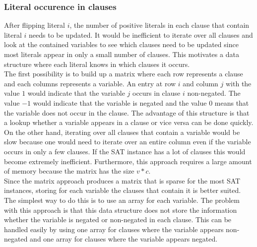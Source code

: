 \documentclass[12pt,a4paper]{article}
\begin{document}
\subsubsection{Literal occurence in clauses}
After flipping literal $i$, the number of positive literals in each clause that contain literal $i$ needs to be updated. It would be inefficient to iterate over all clauses and look at the contained variables to see which clauses need to be updated since most literals appear in only a small number of clauses. This motivates a data structure where each literal knows in which clauses it occurs.\\
The first possibility is to build up a matrix where each row represents a clause and each columns represents a variable. An entry at row $i$ and column $j$ with the value $1$ would indicate that the variable $j$ occurs in clause $i$ non-negated. The value $-1$ would indicate that the variable is negated and the value $0$ means that the variable does not occur in the clause. The advantage of this structure is that a lookup whether a variable appears in a clause or vice versa can be done quickly. On the other hand, iterating over all clauses that contain a variable would be slow because one would need to iterate over an entire column even if the variable occurs in only a few clauses. If the SAT instance has a lot of clauses this would become extremely inefficient. Furthermore, this approach requires a large amount of memory because the matrix has the size $v*c$.\\
Since the matrix approach produces a matrix that is sparse for the most SAT instances, storing for each variable the clauses that contain it is better suited. The simplest way to do this is to use an array for each variable. The problem with this approach is that this data structure does not store the information whether the variable is negated or non-negated in each clause. This can be handled easily by using one array for clauses where the variable appears non-negated and one array for clauses where the variable appears negated.\\
\end{document}
